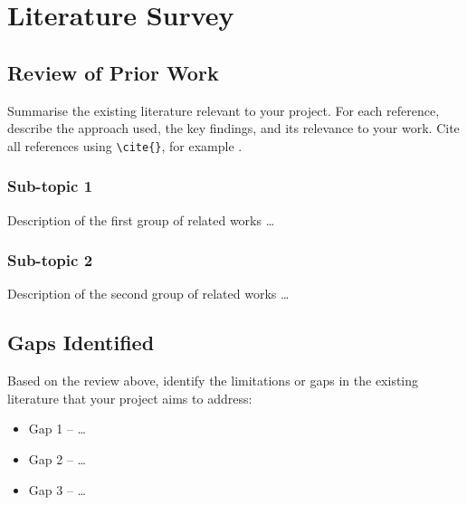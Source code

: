 \chapter{Literature Survey}
\label{chap:litsurvey}

\section{Review of Prior Work}
\label{sec:priorwork}

Summarise the existing literature relevant to your project. For each
reference, describe the approach used, the key findings, and its
relevance to your work. Cite all references using \verb|\cite{}|,
for example \cite{example1}.

\subsection{Sub-topic 1}

Description of the first group of related works \ldots

\subsection{Sub-topic 2}

Description of the second group of related works \ldots

\section{Gaps Identified}
\label{sec:gaps}

Based on the review above, identify the limitations or gaps in the
existing literature that your project aims to address:

\begin{itemize}
  \item Gap 1 -- \ldots
  \item Gap 2 -- \ldots
  \item Gap 3 -- \ldots
\end{itemize}
